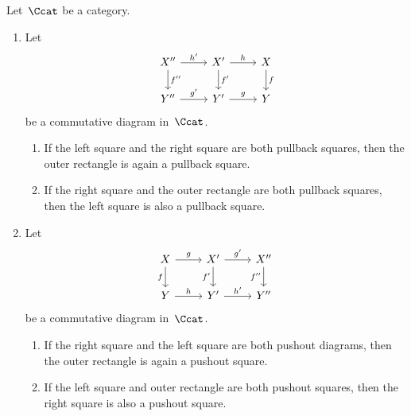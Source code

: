 \begin{lemma*}
  \label{transitivity of pullback and pushout}
  Let~$\Ccat$ be a category.
  \begin{enumerate}
    \item
      Let
      \[
        \begin{tikzcd}
            X''
            \arrow{r}[above]{h'}
            \arrow{d}[right]{f''}
          & X'
            \arrow{r}[above]{h}
            \arrow{d}[right]{f'}
          & X
            \arrow{d}[right]{f}
          \\
            Y''
            \arrow{r}[above]{g'}
          & Y'
            \arrow{r}[above]{g}
          & Y
        \end{tikzcd}
      \]
      be a commutative diagram in~$\Ccat$.
      \begin{enumerate}
        \item
          If the left square and the right square are both pullback squares, then the outer rectangle is again a pullback square.
        \item
          If the right square and the outer rectangle are both pullback squares, then the left square is also a pullback square.
      \end{enumerate}
    \item
      \label{pasting pushouts}
      Let
      \[
        \begin{tikzcd}
            X
            \arrow{r}[above]{g}
            \arrow{d}[left]{f}
          & X'
            \arrow{r}[above]{g'}
            \arrow{d}[left]{f'}
          & X''
            \arrow{d}[left]{f''}
          \\
            Y
            \arrow{r}[above]{h}
          & Y'
            \arrow{r}[above]{h'}
          & Y''
        \end{tikzcd}
      \]
      be a commutative diagram in~$\Ccat$.
      \begin{enumerate}
        \item
          If the right square and the left square are both pushout diagrams, then the outer rectangle is again a pushout square.
        \item
          If the left square and outer rectangle are both pushout squares, then the right square is also a pushout square.
      \end{enumerate}
  \end{enumerate}
\end{lemma*}


